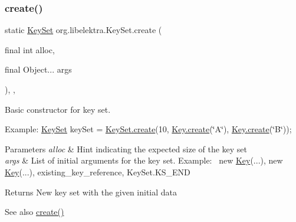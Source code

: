 \subsubsection{\texorpdfstring{create()}{create()}\hspace{0.1cm}{\footnotesize\ttfamily [1/3]}}
{\footnotesize\ttfamily static \hyperlink{classorg_1_1libelektra_1_1KeySet}{Key\+Set} org.\+libelektra.\+Key\+Set.\+create (\begin{DoxyParamCaption}\item[{final int}]{alloc,  }\item[{final Object...}]{args }\end{DoxyParamCaption})\hspace{0.3cm}{\ttfamily [inline]}, {\ttfamily [static]}, {\ttfamily [protected]}}



Basic constructor for key set. 

Example\+: \hyperlink{classorg_1_1libelektra_1_1KeySet}{Key\+Set} key\+Set = \hyperlink{classorg_1_1libelektra_1_1KeySet_ae3f1cd9ac1a4fd2ef7d16e6c320bc6a3}{Key\+Set.\+create}(10, \hyperlink{classorg_1_1libelektra_1_1Key_af407cf43625618af4e7fb2576037fcfc}{Key.\+create}(\char`\"{}\+A\char`\"{}), \hyperlink{classorg_1_1libelektra_1_1Key_af407cf43625618af4e7fb2576037fcfc}{Key.\+create}(\char`\"{}\+B\char`\"{}));


\begin{DoxyParams}{Parameters}
{\em alloc} & Hint indicating the expected size of the key set \\
\hline
{\em args} & List of initial arguments for the key set. Example\+:~\newline
 new \hyperlink{classorg_1_1libelektra_1_1Key}{Key}(...), new \hyperlink{classorg_1_1libelektra_1_1Key}{Key}(...), existing\+\_\+key\+\_\+reference, Key\+Set.\+K\+S\+\_\+\+E\+ND \\
\hline
\end{DoxyParams}
\begin{DoxyReturn}{Returns}
New key set with the given initial data 
\end{DoxyReturn}
\begin{DoxySeeAlso}{See also}
\hyperlink{classorg_1_1libelektra_1_1KeySet_ac0ba4b88bef5e731b586f4ca63b9ab7f}{create()} 
\end{DoxySeeAlso}
\mbox{\label{classorg_1_1libelektra_1_1KeySet_ac0ba4b88bef5e731b586f4ca63b9ab7f}} 
